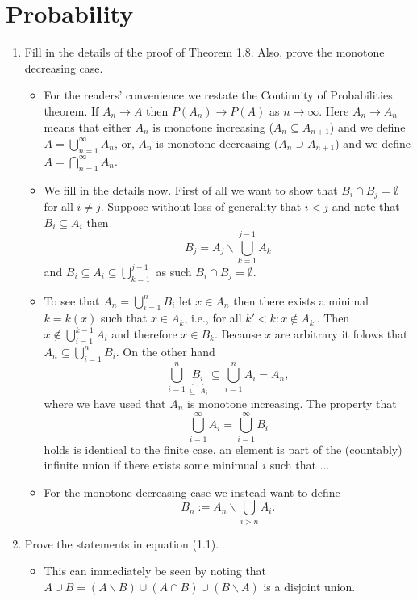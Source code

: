 \documentclass{article}
\begin{document}
\tableofcontents

\newpage

\section{Probability}
\begin{enumerate}
	\item Fill in the details of the proof of Theorem 1.8. Also, prove the monotone decreasing case.
		\begin{itemize}
			\item For the readers' convenience we restate the Continuity of Probabilities theorem. If $A_n \rightarrow A$ then $P(A_n) \rightarrow P(A)$ as $n \rightarrow \infty$. Here $A_n \rightarrow A_n$ means that either $A_n$ is monotone increasing ($A_n \subseteq A_{n + 1}$) and we define $A = \bigcup_{n = 1}^\infty A_n$, or, $A_n$ is monotone decreasing ($A_n \supseteq A_{n + 1}$) and we define $A = \bigcap_{n = 1}^\infty A_n$.
			\item We fill in the details now. First of all we want to show that $B_i \cap B_j = \emptyset$ for all $i \neq j$. Suppose without loss of generality that $i < j$ and note that $B_i \subseteq A_i$ then
			$$
			B_j = A_j \backslash \bigcup_{k = 1}^{j - 1} A_k
			$$
			and $B_i \subseteq A_i \subseteq \bigcup_{k = 1}^{j - 1}$ as such $B_i \cap B_j = \emptyset$.
			\item To see that $A_n = \bigcup_{i = 1}^n B_i$ let $x \in A_n$ then there exists a minimal $k = k(x)$ such that $x \in A_k$, i.e., for all $k' < k : x \notin A_{k'}$. Then $x \notin \bigcup_{i = 1}^{k - 1} A_i$ and therefore $x \in B_k$. Because $x$ are arbitrary it folows that $A_n \subseteq \bigcup_{i = 1}^n B_i$. On the other hand
			$$
			\bigcup_{i = 1}^n \underbrace{B_i}_{\subseteq\ A_i} \subseteq \bigcup_{i = 1}^n A_i = A_n,
			$$
			where we have used that $A_n$ is monotone increasing. The property that
			$$
			\bigcup_{i = 1}^\infty A_i = \bigcup_{i = 1}^\infty B_i
			$$
			holds is identical to the finite case, an element is part of the (countably) infinite union if there exists some minimual $i$ such that ...
			\item For the monotone decreasing case we instead want to define
			$$
			B_n := A_n \backslash \bigcup_{i > n} A_i.
			$$
		\end{itemize}
	\item Prove the statements in equation (1.1).
		\begin{itemize}
			\item This can immediately be seen by noting that $A \cup B = (A \backslash B) \cup (A \cap B) \cup (B \backslash A)$ is a disjoint union.

\end{itemize}
\end{enumerate}
\end{document}
